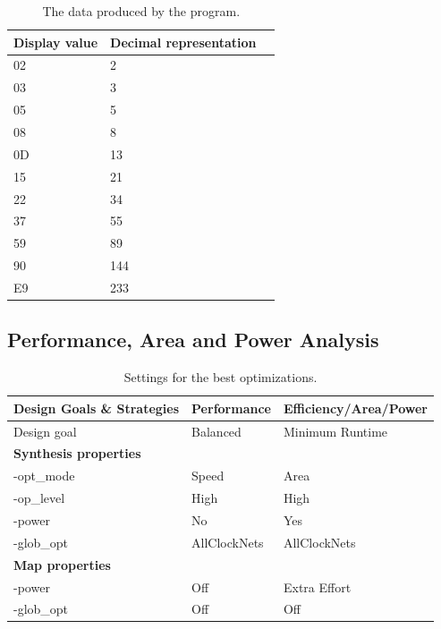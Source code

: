 \documentclass[a4,11pt]{article}
\begin{document}
\begin{table}   
	\centering
	\small
	\def\arraystretch{1.1}              
	\begin{tabular}{|l|l|l|}
		\hline
		Display value & Decimal representation \\ \hline
		02  & 2                                \\
    03  & 3                                \\
    05  & 5                                \\
    08  & 8                                \\
    0D  & 13                               \\
    15  & 21                               \\
    22  & 34                               \\
    37  & 55                               \\
    59  & 89                               \\
    90  & 144                              \\    
    E9  & 233                              \\ \hline
	\end{tabular}
	\caption{The data produced by the program.}
	\label{tab:fib_data}
\end{table}

\subsection{Performance, Area and Power Analysis}

\begin{table}   
	\centering
	\small
	\def\arraystretch{1.1}              
	\begin{tabular}{|l|l|l|}
		\hline
		{\bf Design Goals \& Strategies} & \bf Performance  & \bf Efficiency/Area/Power \\ \hline
		Design goal                      & Balanced         & Minimum Runtime           \\ \hline
		{\bf Synthesis properties}       &                  &                           \\ \hline
		-opt\_mode                       & Speed            & Area                      \\
		-op\_level                       & High             & High                      \\ 
		-power                           & No               & Yes                       \\ 
		-glob\_opt                       & AllClockNets     & AllClockNets              \\ \hline
		{\bf Map properties}             &                  &                           \\ \hline
		-power                           & Off              & Extra Effort              \\ 
		-glob\_opt                       & Off              & Off                       \\ \hline
	\end{tabular}
	\caption{Settings for the best optimizations.}
	\label{tab:set}
\end{table}
\end{document}

